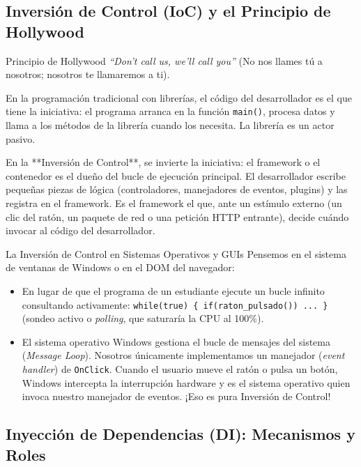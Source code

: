 \subsection{Inversión de Control (IoC) y el Principio de Hollywood}

\begin{definicion}{Principio de Hollywood}
\emph{``Don't call us, we'll call you''} (No nos llames tú a nosotros; nosotros te llamaremos a ti).
\end{definicion}

En la programación tradicional con librerías, el código del desarrollador es el que tiene la iniciativa: el programa arranca en la función \texttt{main()}, procesa datos y llama a los métodos de la librería cuando los necesita. La librería es un actor pasivo.

En la **Inversión de Control**, se invierte la iniciativa: el framework o el contenedor es el dueño del bucle de ejecución principal. El desarrollador escribe pequeñas piezas de lógica (controladores, manejadores de eventos, plugins) y las registra en el framework. Es el framework el que, ante un estímulo externo (un clic del ratón, un paquete de red o una petición HTTP entrante), decide cuándo invocar al código del desarrollador.

\begin{ejemplo}{La Inversión de Control en Sistemas Operativos y GUIs}
Pensemos en el sistema de ventanas de Windows o en el DOM del navegador:
\begin{itemize}[leftmargin=1.5em]
  \item En lugar de que el programa de un estudiante ejecute un bucle infinito consultando activamente: \texttt{while(true) \{ if(raton\_pulsado()) ... \}} (sondeo activo o \emph{polling}, que saturaría la CPU al 100\%).
  \item El sistema operativo Windows gestiona el bucle de mensajes del sistema (\emph{Message Loop}). Nosotros únicamente implementamos un manejador (\emph{event handler}) de \texttt{OnClick}. Cuando el usuario mueve el ratón o pulsa un botón, Windows intercepta la interrupción hardware y es el sistema operativo quien invoca nuestro manejador de eventos. ¡Eso es pura Inversión de Control!
\end{itemize}
\end{ejemplo}

\subsection{Inyección de Dependencias (DI): Mecanismos y Roles}

